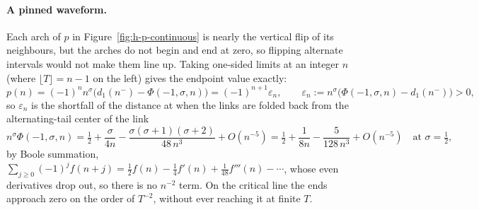 \documentclass[11pt]{article}
\theoremstyle{definition}
\begin{document}
\paragraph{A pinned waveform.} Each arch of $p$ in
Figure~\ref{fig:h-p-continuous} is nearly the vertical flip of its
neighbours, but the arches do not begin and end at zero, so flipping alternate
intervals would not make them line up. Taking one-sided limits at an integer
$n$ (where $\lfloor T\rfloor=n-1$ on the left) gives the endpoint value
exactly:
\begin{equation}\label{eq:eps-n}
p(n)=(-1)^{n}n^{\sigma}\bigl(d_1(n^-)-\Phi(-1,\sigma,n)\bigr)
=(-1)^{n+1}\varepsilon_n,
\qquad
\varepsilon_n:=n^{\sigma}\bigl(\Phi(-1,\sigma,n)-d_1(n^-)\bigr)>0,
\end{equation}
so $\varepsilon_n$ is the shortfall of the distance at when the links
are folded back from the alternating-tail center of the link
\begin{equation}\label{eq:alt-tail-center}
n^{\sigma}\Phi(-1,\sigma,n)
=\tfrac12+\frac{\sigma}{4n}-\frac{\sigma(\sigma+1)(\sigma+2)}{48\,n^{3}}
+O(n^{-5})
=\tfrac12+\frac{1}{8n}-\frac{5}{128\,n^{3}}+O(n^{-5})
\quad\text{at }\sigma=\tfrac12,
\end{equation}
by Boole summation, $\sum_{j\ge0}(-1)^{j}f(n+j)=\tfrac12f(n)-\tfrac14f'(n)
+\tfrac1{48}f'''(n)-\cdots$, whose even derivatives drop out, so there is no
$n^{-2}$ term. On the critical line the
ends approach zero on the order of $T^{-2}$, without ever reaching it at
finite $T$.
\end{document}
